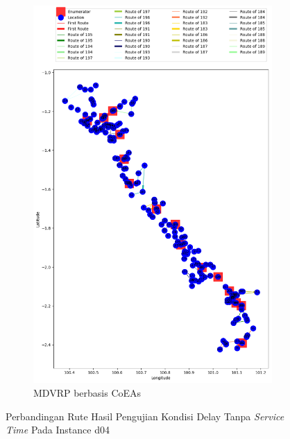 \begin{figure}[H]
	\centering
	\begin{subfigure}[t]{\textwidth}
		\centering
		\includegraphics[width=\textwidth]{Resources/Images/delayed_4/real_m15_n100_delayed_4_coes}
		\caption{MDVRP berbasis CoEAs}
		\label{fig:real_m15_n100_delayed_4_coes}
	\end{subfigure}
	\caption{Perbandingan Rute Hasil Pengujian Kondisi Delay Tanpa \textit{Service Time} Pada Instance d04}
	\label{fig:real_m15_n100_delayed_4}
\end{figure}



